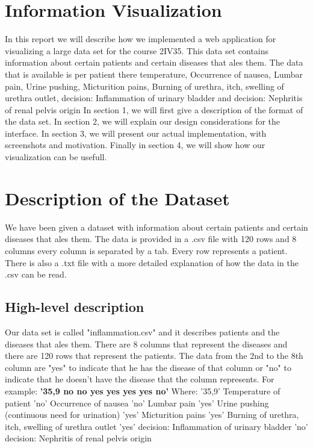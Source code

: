 \documentclass[a4paper,twoside,11pt]{article}
\begin{document}
\section*{Information Visualization}
In this report we will describe how we implemented a web application for visualizing a large data set for the course 2IV35. This data set contains information about certain patients and certain diseases that ales them. \newline
The data that is available is per patient there temperature, Occurrence of nausea, Lumbar pain, Urine pushing, Micturition pains,  Burning of urethra, itch, swelling of urethra outlet, decision: Inflammation of urinary bladder and decision: Nephritis of renal pelvis origin \newline
In section 1, we will first give a description of the format of the data set. \newline
In section 2, we will explain our design considerations for the interface. \newline
In section 3, we will present our actual implementation, with screenshots and motivation. \newline
Finally in section 4, we will show how our visualization can be usefull. \newline
\newpage
\section{Description of the Dataset}
We have been given a dataset with information about certain patients and certain diseases that ales them. The data is provided in a .csv file with 120 rows and 8 columns every column is separated by a tab. Every row represents a patient. There is also a .txt file with a more detailed explanation of how the data in the .csv can be read.
\subsection{High-level description}
Our data set is called "inflammation.csv" and it describes patients and the diseases that ales them. There are 8 columns that represent the diseases and there are 120 rows that represent the patients. The data from the 2nd to the 8th column are "yes" to indicate that he has the disease of that column or "no" to indicate that he doesn't have the disease that the column represents. For example: \newline
\textbf{'35,9 no no yes yes yes yes no'} \newline
Where: \newline
'35,9' Temperature of patient \newline
'no' Occurrence of nausea \newline
'no' Lumbar pain \newline
'yes' Urine pushing (continuous need for urination) \newline
'yes' Micturition pains \newline
'yes' Burning of urethra, itch, swelling of urethra outlet \newline
'yes' decision: Inflammation of urinary bladder \newline
'no' decision: Nephritis of renal pelvis origin  \newline
\end{document}

